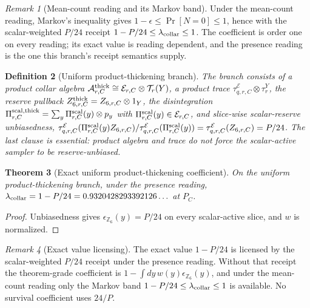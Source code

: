 \documentclass[11pt]{article}
\newtheorem{theorem}{Theorem}[section]
\newtheorem{definition}[theorem]{Definition}
\theoremstyle{remark}
\newtheorem{remark}[theorem]{Remark}
\theoremstyle{plain}
\begin{document}
\begin{remark}[Mean-count reading and its Markov band]
\label{rem:mean-count-markov-band}
Under the mean-count reading, Markov's inequality gives
\(1-\epsilon\le\Pr[N=0]\le1\), hence with the scalar-weighted \(P/24\)
receipt \(1-P/24\le\lambda_{\rm collar}\le1\). The coefficient is order one
on every reading; its exact value is reading dependent, and the presence
reading is the one this branch's receipt semantics supply.
\end{remark}

\begin{definition}[Uniform product-thickening branch]
\label{def:uniform-product-thickening-branch}
The branch consists of a product collar algebra
\(\mathcal A^{\rm thick}_{r,C}\cong\mathcal E_{r,C}\otimes\mathcal T_r(Y)\),
a product trace \(\tau^{\mathcal E}_{q,r,C}\otimes\tau^Y_r\), the reserve
pullback \(Z^{\rm thick}_{6,r,C}=Z_{6,r,C}\otimes1_Y\), the disintegration
\(\Pi^{\rm scal,thick}_{r,C}=\sum_y\Pi^{\rm scal}_{r,C}(y)\otimes p_y\) with
\(\Pi^{\rm scal}_{r,C}(y)\in\mathcal E_{r,C}\), and slice-wise scalar-reserve
unbiasedness,
\(\tau^{\mathcal E}_{q,r,C}(\Pi^{\rm scal}_{r,C}(y)Z_{6,r,C})/
\tau^{\mathcal E}_{q,r,C}(\Pi^{\rm scal}_{r,C}(y))=\tau^{\mathcal E}_{q,r,C}(Z_{6,r,C})=P/24\).
The last clause is essential: product algebra and trace do not force the
scalar-active sampler to be reserve-unbiased.
\end{definition}

\begin{theorem}[Exact uniform product-thickening coefficient]
\label{thm:exact-uniform-product-thickening-coefficient}
On the uniform product-thickening branch, under the presence reading,
\(\lambda_{\rm collar}=1-P/24=0.9320428293392126\ldots\) at \(P_C\).
\end{theorem}

\begin{proof}
Unbiasedness gives \(\epsilon_{\mathbb Z_6}(y)=P/24\) on every scalar-active
slice, and \(w\) is normalized.
\end{proof}

\begin{remark}[Exact value licensing]
\label{rem:exact-value-gate}
\label{sec:local-scalar-receipt-ledger}
The exact value \(1-P/24\) is licensed by the scalar-weighted \(P/24\)
receipt under the presence reading. Without that receipt the theorem-grade
coefficient is \(1-\int dy\,w(y)\epsilon_{\mathbb Z_6}(y)\), and under the
mean-count reading only the Markov band \(1-P/24\le\lambda_{\rm collar}\le1\)
is available. No survival coefficient uses \(24/P\).
\end{remark}
\end{document}

